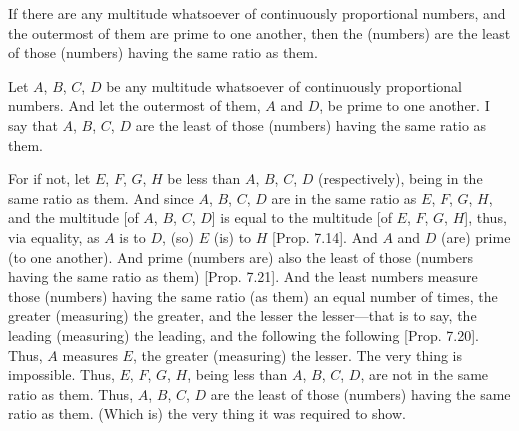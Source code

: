 \begin{Parallel}{}{}
{If there are any multitude whatsoever of continuously proportional
numbers, and the outermost of them are prime to one another, then
the (numbers) are the least of those (numbers) having the same ratio as them.

\epsfysize=0.9in
\centerline{}

Let $A$, $B$, $C$,  $D$ be any multitude whatsoever of continuously proportional
numbers. And let the outermost of them, $A$ and $D$, be prime to
one another. I say that $A$, $B$, $C$, $D$ are the least of those
(numbers) having the same ratio as them.

For if not, let $E$, $F$, $G$, $H$ be less than $A$, $B$, $C$,  $D$ (respectively),
being in the same ratio as them. And since $A$, $B$, $C$, $D$ are
in the same ratio as $E$, $F$, $G$,  $H$, and
the multitude [of $A$, $B$, $C$, $D$] is equal to the
multitude [of $E$, $F$, $G$, $H$], thus, via equality, as
$A$ is to $D$, (so) $E$ (is) to $H$ [Prop. 7.14]. 
And $A$ and $D$ (are) prime (to one another). And prime (numbers are)
also the least of those (numbers having the same ratio as them) [Prop. 7.21]. And the least numbers measure those
(numbers) having the same ratio (as them) an equal number of times, the
greater (measuring) the greater, and the lesser the lesser---that is to say,
the leading (measuring) the leading, and the following the following [Prop. 7.20]. Thus, $A$ measures $E$, the
greater (measuring) the lesser. The very thing is impossible. Thus, $E$,
$F$, $G$,  $H$, being less than $A$, $B$, $C$, $D$, are not
in the same ratio as them. Thus, $A$, $B$, $C$,  $D$ are the least of those
(numbers) having the same ratio as them. (Which is) the very thing it was required to show.}
\end{Parallel}

